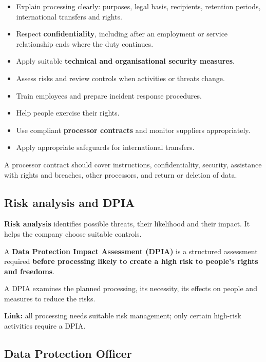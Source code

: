 \documentclass[12pt,a4paper]{report}
\newcommand{\tightlist}{}
\begin{document}
\begin{itemize}
\tightlist
\item
  Explain processing clearly: purposes, legal basis, recipients, retention periods, international transfers and rights.
\item
  Respect \textbf{confidentiality}, including after an employment or service relationship ends where the duty continues.
\item
  Apply suitable \textbf{technical and organisational security measures}.
\item
  Assess risks and review controls when activities or threats change.
\item
  Train employees and prepare incident response procedures.
\item
  Help people exercise their rights.
\item
  Use compliant \textbf{processor contracts} and monitor suppliers appropriately.
\item
  Apply appropriate safeguards for international transfers.
\end{itemize}

A processor contract should cover instructions, confidentiality, security, assistance with rights and breaches, other processors, and return or deletion of data.

\hypertarget{risk-analysis-and-dpia}{%
\subsection{Risk analysis and DPIA}\label{risk-analysis-and-dpia}}

\textbf{Risk analysis} identifies possible threats, their likelihood and their impact. It helps the company choose suitable controls.

A \textbf{Data Protection Impact Assessment (DPIA)} is a structured assessment required \textbf{before processing likely to create a high risk to people's rights and freedoms}.

A DPIA examines the planned processing, its necessity, its effects on people and measures to reduce the risks.

\textbf{Link:} all processing needs suitable risk management; only certain high-risk activities require a DPIA.

\hypertarget{data-protection-officer}{%
\subsection{Data Protection Officer}\label{data-protection-officer}}
\end{document}
